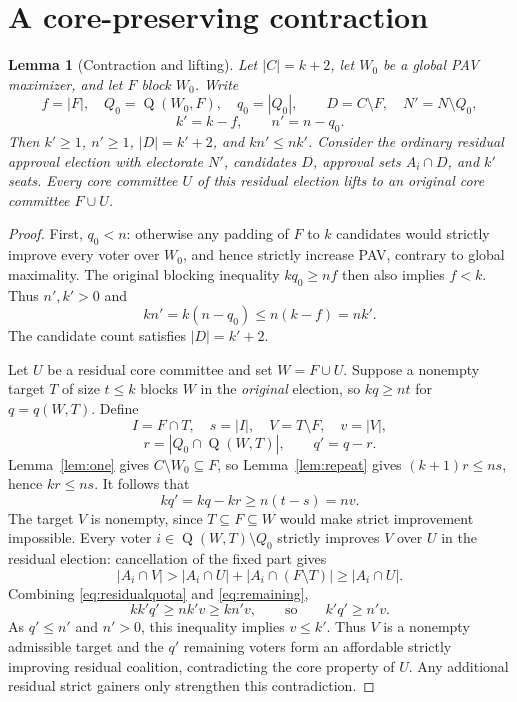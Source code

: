 \documentclass[11pt]{article}
\newtheorem{lemma}[theorem]{Lemma}
\newcommand{\gain}{\operatorname{Q}}
\begin{document}
\section{A core-preserving contraction}\label{sec:contraction}
\begin{lemma}[Contraction and lifting]\label{lem:lift}
Let $|C|=k+2$, let $W_0$ be a global PAV maximizer, and let $F$ block $W_0$.
Write
\[
 f=|F|,\quad Q_0=\gain(W_0,F),\quad q_0=|Q_0|,\qquad
 D=C\setminus F,\quad N'=N\setminus Q_0,
\]
\[
 k'=k-f,\qquad n'=n-q_0.
\]
Then $k'\ge1$, $n'\ge1$, $|D|=k'+2$, and $kn'\le nk'$. Consider the
ordinary residual approval election with electorate $N'$, candidates $D$,
approval sets $A_i\cap D$, and $k'$ seats. Every core committee $U$ of
this residual election lifts to an original core committee $F\cup U$.
\end{lemma}
\begin{proof}
First, $q_0<n$: otherwise any padding of $F$ to $k$ candidates would
strictly improve every voter over $W_0$, and hence strictly increase PAV,
contrary to global maximality. The original blocking inequality
$kq_0\ge nf$ then also implies $f<k$. Thus $n',k'>0$ and
\begin{equation}\label{eq:residualquota}
 kn'=k(n-q_0)\le n(k-f)=nk'.
\end{equation}
The candidate count satisfies $|D|=k'+2$.

Let $U$ be a residual core committee and set $W=F\cup U$. Suppose a
nonempty target $T$ of size $t\le k$ blocks $W$ in the \emph{original}
election, so $kq\ge nt$ for $q=q(W,T)$. Define
\[
 I=F\cap T,\quad s=|I|,\quad V=T\setminus F,\quad v=|V|,
\]
\[
 r=|Q_0\cap\gain(W,T)|,\qquad q'=q-r.
\]
Lemma~\ref{lem:one} gives $C\setminus W_0\subseteq F$, so
Lemma~\ref{lem:repeat} gives $(k+1)r\le ns$, hence $kr\le ns$.
It follows that
\begin{equation}\label{eq:remaining}
 kq'=kq-kr\ge n(t-s)=nv.
\end{equation}
The target $V$ is nonempty, since $T\subseteq F\subseteq W$ would make
strict improvement impossible. Every voter $i\in\gain(W,T)\setminus Q_0$
strictly improves $V$ over $U$ in the residual election: cancellation of
the fixed part gives
\[
 |A_i\cap V|>|A_i\cap U|+|A_i\cap(F\setminus T)|
 \ge |A_i\cap U|.
\]
Combining \eqref{eq:residualquota} and \eqref{eq:remaining},
\[
 kk'q'\ge nk'v\ge kn'v,
 \qquad\text{so}\qquad k'q'\ge n'v.
\]
As $q'\le n'$ and $n'>0$, this inequality implies $v\le k'$.
Thus $V$ is a nonempty admissible target and the $q'$ remaining voters
form an affordable strictly improving residual coalition, contradicting
the core property of $U$. Any additional residual strict gainers only
strengthen this contradiction.
\end{proof}
\end{document}
